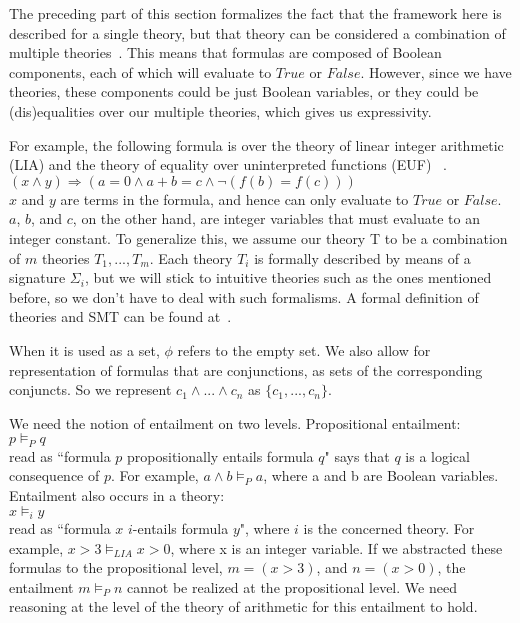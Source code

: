 \documentclass{article}
\begin{document}
The preceding part of this section formalizes the fact 
that the framework here is 
described for a single theory, but that theory can 
be considered a combination of multiple 
theories~\cite{Manna2003}. This means that formulas are 
composed of Boolean components, each of which will 
evaluate to $True$ or $False$. However, since 
we have theories, these components could be just Boolean 
variables, or they could be (dis)equalities over our 
multiple theories, which gives us expressivity. 

For example, the following formula is over 
the theory of linear integer 
arithmetic (LIA) and the theory of 
equality over uninterpreted functions (EUF)
~\cite{LIAEUF}.\\
$(x \land y) \Rightarrow (a = 0 \land a + b = c \land 
\neg (f(b) = f(c)))$ \\
$x$ and $y$ are terms in the 
formula, and hence can only evaluate to $True$ or $False$.
$a$, $b$, and $c$, on the other hand, are integer variables 
that must evaluate to an integer constant. To generalize 
this, we assume our theory T to be a combination of $m$ 
theories $T_1, ..., T_m$. Each theory $T_i$ is formally 
described by means of a signature $\Sigma_i$, but we 
will stick to intuitive theories such as the ones mentioned 
before, so we don't have to deal with such formalisms. A 
formal definition of theories and SMT can be found 
at~\cite{DBLP:reference/mc/BarrettT18}.

When it is used as a set, $\phi$ refers to the empty set. 
We also allow for representation of formulas that are 
conjunctions, as sets of the corresponding 
conjuncts. So we represent $c_1 \land ... \land c_n$ as
$\{c_1, ..., c_n\}$.

We need the notion of entailment on two levels. Propositional 
entailment: \\
$p \models_P q$ \\
read as ``formula $p$ propositionally entails formula $q$" says 
that $q$ is a logical consequence of $p$. For example, 
$a \land b \models_P a$, where a and b are Boolean 
variables. Entailment also occurs in a theory: \\
$x \models_i y$ \\
read as ``formula $x$ $i$-entails formula $y$", where 
$i$ is the concerned theory. For example, 
$x > 3 \models_{LIA} x > 0$, where x is an integer variable.
If we abstracted these formulas to the propositional level, 
$m = (x > 3)$, and $n = (x > 0)$, 
the entailment $m \models_P n$ cannot be realized at the 
propositional level. We need reasoning at the level of 
the theory of arithmetic for this entailment to hold.
\end{document}
